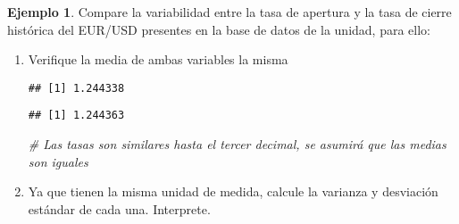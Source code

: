 \documentclass[
]{book}
\newenvironment{Shaded}{\begin{snugshade}}{\end{snugshade}}
\newcommand{\CommentTok}[1]{\textcolor[rgb]{0.56,0.35,0.01}{\textit{#1}}}
\newcommand{\FunctionTok}[1]{\textcolor[rgb]{0.00,0.00,0.00}{#1}}
\newcommand{\NormalTok}[1]{#1}
\newcommand{\SpecialCharTok}[1]{\textcolor[rgb]{0.00,0.00,0.00}{#1}}
\theoremstyle{definition}
\theoremstyle{definition}
\newtheorem{example}{Ejemplo}[chapter]
\theoremstyle{definition}
\theoremstyle{definition}
\theoremstyle{remark}
\begin{document}
\begin{example}

Compare la variabilidad entre la tasa de apertura y la tasa de cierre histórica del EUR/USD presentes en la base de datos de la unidad, para ello:

\begin{enumerate}
\def\labelenumi{\arabic{enumi}.}
\item
  Verifique la media de ambas variables la misma

\begin{Shaded}
\end{Shaded}

\begin{verbatim}
## [1] 1.244338
\end{verbatim}

\begin{Shaded}
\end{Shaded}

\begin{verbatim}
## [1] 1.244363
\end{verbatim}

\begin{Shaded}
\begin{Highlighting}[]
\CommentTok{\# Las tasas son similares hasta el tercer decimal, se asumirá que las medias son iguales}
\end{Highlighting}
\end{Shaded}
\item
  Ya que tienen la misma unidad de medida, calcule la varianza y desviación estándar de cada una. Interprete.

\begin{Shaded}
\end{Shaded}


\end{enumerate}
\end{example}
\end{document}
